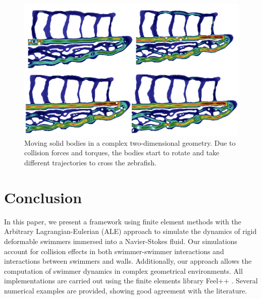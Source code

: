 \documentclass[graybox]{svmult}
\begin{document}


\begin{figure}
	\centering
	\includegraphics[width=0.85\linewidth]{Figures/zf/zf.png}

	\caption{Moving solid bodies in a complex two-dimensional geometry. Due to collision forces and torques, the bodies start to rotate and take different trajectories to cross the zebrafish.}
	\label{Fig:insertion2D}
\end{figure}



\section{Conclusion}

\color{blue}
In this paper, we present a framework using finite element methods with the Arbitrary Lagrangian-Eulerian (ALE) approach to simulate the dynamics of rigid deformable swimmers immersed into a Navier-Stokes fluid. Our simulations account for collision effects in both swimmer-swimmer interactions and interactions between swimmers and walls. Additionally, our approach allows the computation of swimmer dynamics in complex geometrical environments. All implementations are carried out using the finite elements library Feel++ \cite{feelpp-ref}. Several numerical examples are provided, showing good agreement with the literature.
\color{black}
\end{document}
